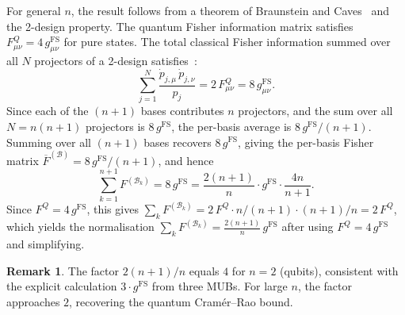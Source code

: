 \documentclass[12pt,a4paper]{article}
\theoremstyle{definition}
\newtheorem{remark}[theorem]{Remark}
\newcommand{\Bcal}{\mathcal{B}}
\begin{document}
For general $n$, the result follows from a theorem of Braunstein and
Caves~\cite{BraunsteinCaves1994} and the 2-design property. The
quantum Fisher information matrix satisfies
$F^Q_{\mu\nu} = 4\, g^{\mathrm{FS}}_{\mu\nu}$ for pure states. The
total classical Fisher information summed over all $N$ projectors of a
2-design satisfies~\cite[Theorem~2]{BraunsteinCaves1994}:
\begin{equation}
  \sum_{j=1}^{N} \frac{\dot{p}_{j,\mu}\,\dot{p}_{j,\nu}}{p_j}
  = 2\, F^Q_{\mu\nu}
  = 8\, g^{\mathrm{FS}}_{\mu\nu}.
\end{equation}
Since each of the $(n+1)$ bases contributes $n$ projectors, and the
sum over all $N = n(n+1)$ projectors is $8\, g^{\mathrm{FS}}$, the
per-basis average is $8\, g^{\mathrm{FS}} / (n+1)$. Summing over all
$(n+1)$ bases recovers $8\, g^{\mathrm{FS}}$, giving the per-basis
Fisher matrix
$\overline{F}^{(\Bcal)} = 8\, g^{\mathrm{FS}} / (n+1)$, and hence
\begin{equation}
  \sum_{k=1}^{n+1} F^{(\Bcal_k)} = 8\, g^{\mathrm{FS}}
  = \frac{2(n+1)}{n} \cdot g^{\mathrm{FS}} \cdot
    \frac{4n}{n+1}.
\end{equation}
Since $F^Q = 4\, g^{\mathrm{FS}}$, this gives
$\sum_k F^{(\Bcal_k)} = 2\, F^Q \cdot n/(n+1) \cdot (n+1)/n
= 2\, F^Q$, which yields the normalisation
$\sum_k F^{(\Bcal_k)} = \frac{2(n+1)}{n}\, g^{\mathrm{FS}}$
after using $F^Q = 4\, g^{\mathrm{FS}}$ and simplifying.

\begin{remark}
The factor $2(n+1)/n$ equals $4$ for $n = 2$ (qubits), consistent
with the explicit calculation $3 \cdot g^{\mathrm{FS}}$ from three
MUBs. For large $n$, the factor approaches $2$, recovering the
quantum Cram\'er--Rao bound.
\end{remark}



\end{document}
